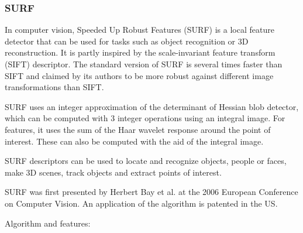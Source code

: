 \documentclass[12pt]{article}
\begin{document}
\subsubsection{SURF}

In computer vision, Speeded Up Robust Features (SURF) is a local feature detector that can be used for tasks such as object recognition or 3D reconstruction. It is partly inspired by the scale-invariant feature transform (SIFT) descriptor. The standard version of SURF is several times faster than SIFT and claimed by its authors to be more robust against different image transformations than SIFT.

SURF uses an integer approximation of the determinant of Hessian blob detector, which can be computed with 3 integer operations using an integral image. For features, it uses the sum of the Haar wavelet response around the point of interest. These can also be computed with the aid of the integral image.

SURF descriptors can be used to locate and recognize objects, people or faces, make 3D scenes, track objects and extract points of interest.

SURF was first presented by Herbert Bay et al. at the 2006 European Conference on Computer Vision. An application of the algorithm is patented in the US.

Algorithm and features:
\end{document}
